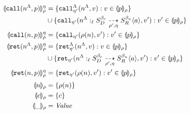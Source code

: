 \documentclass[preprint,onecolumn,9pt]{sigplanconf} %
\begin{document}
\begin{align*}
  \denoteevent{\scallev{\mtoplevelname}{\mvpat}}{\menv}{\mtimeline} &=
    \setbuild{\aptopcall{\mtoplevelname}{\mval}{\mtimeline'}}
             {\mval \in \denotevpat{\mvpat}{\menv}}
    \\ &\cup
    \setbuild{\apvcall{\blclos{\mtoplevelname}{\mmlab_u}{\mmlab_c}{\mlab}{\mscon_D}{\mscon_R}{\menv'}{\mtimeline}{\maddr}}{\mval'}{\mtimeline'}}
             {\mval' \in \denotevpat{\mvpat}{\menv}}
\\
  \denoteevent{\scallev{\mname}{\mvpat}}{\menv}{\mtimeline} &=
    \setbuild{\apvcall{\menv(\mname)}{\mval'}{\mtimeline'}}
            {\mval' \in \denotevpat{\mvpat}{\menv}}
\\
  \denoteevent{\sretev{\mtoplevelname}{\mvpat}}{\menv}{\mtimeline} &=
    \setbuild{\aptopret{\mtoplevelname}{\mval}{\mtimeline'}}
             {\mval \in \denotevpat{\mvpat}{\menv}}
    \\ &\cup
    \setbuild{\apvret{\blclos{\mtoplevelname}{\mmlab_u}{\mmlab_c}{\mlab}{\mscon_D}{\mscon_R}{\menv'}{\mtimeline}{\maddr}}{\mval'}{\mtimeline'}}
             {\mval' \in \denotevpat{\mvpat}{\menv}}
\\
  \denoteevent{\sretev{\mname}{\mvpat}}{\menv}{\mtimeline} &=
    \setbuild{\apvret{\menv(\mname)}{\mval'}{\mtimeline'}}
            {\mval' \in \denotevpat{\mvpat}{\menv}}
\\[2pt]
  \denotevpat{\mname}{\menv} &= \setof{\menv(\mname)}
\\
  \denotevpat{\mconstant}{\menv} &= \setof{\mconstant}
\\
  \denotevpat{\swc}{\menv} &= \Value
\end{align*}
\end{document}
